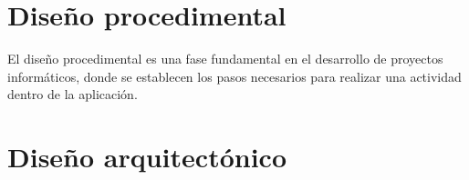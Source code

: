 \section{Diseño procedimental}
El diseño procedimental es una fase fundamental en el desarrollo de proyectos informáticos, donde se establecen los pasos necesarios para realizar una actividad dentro de la aplicación.


\section{Diseño arquitectónico}


